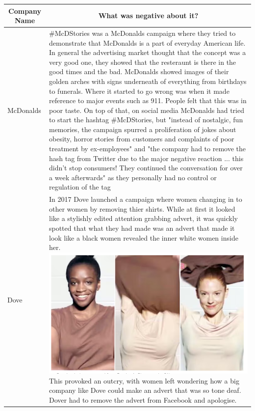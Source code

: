 \documentclass{article}
\begin{document}
\begin{table}[h!]
    \centering
    \begin{tabular}{|p{}|p{}|}
       \hline
       \multicolumn{1}{c}{\bfseries Company Name} & \multicolumn{1}{c}{\bfseries What was negative about it?}  \\
             \hline
	McDonalds & \#McDStories was a McDonalds campaign where they tried to demonstrate that McDonalds is a part of everyday American life. In general the advertising market thought that the concept was a very good one, they showed that the resteraunt is there in the good times and the bad. McDonalds showed images of their golden arches with signs underneath of everything from birthdays to funerals. Where it started to go wrong was when it made reference to major events such as 911. People felt that this was in poor taste. On top of that, on social media McDonalds had tried to start the hashtag \#McDStories, but "instead of nostalgic, fun memories, the campaign spurred a proliferation of jokes about obesity, horror stories from customers and complaints of poor treatment by ex-employees" and "the company had to remove the hash tag from Twitter due to the major negative reaction ... this didn’t stop consumers! They continued the conversation for over a week afterwards" as they personally had no control or regulation of the tag \cite{McD} \\
        \hline
	Dove & In 2017 Dove launched a campaign where women changing in to other women by removing thier shirts. While at first it looked like a stylishly edited attention grabbing advert, it was quickly spotted that what they had made was an advert that made it look like a black women revealed the inner white women inside her. \includegraphics[scale=0.4]{Dove} \cite{Dove} This provoked an outcry, with women left wondering how a big company like Dove could make an advert that was so tone deaf. Dover had to remove the advert from Facebook and apologise. \\
        \hline
    \end{tabular}

\end{table}
\end{document}
